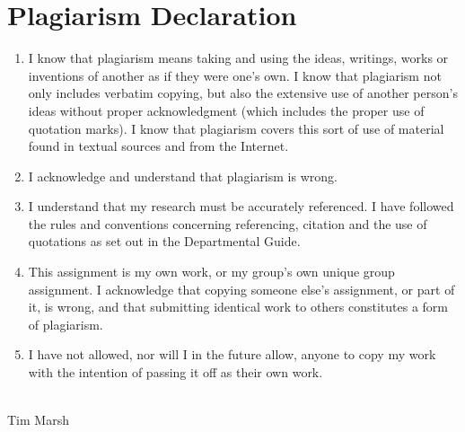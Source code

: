 \chapter*{Plagiarism Declaration}

	\begin{enumerate}
	
	\item
	I know that plagiarism means taking and using the ideas, writings, works
	or inventions of another as if they were one's own. I know that plagiarism
	not only includes verbatim copying, but also the extensive use of another
	person's ideas without proper acknowledgment (which includes the proper
	use of quotation marks). I know that plagiarism covers this sort of use of
	material found in textual sources and from the Internet.
	
	\item
	I acknowledge and understand that plagiarism is wrong.
	
	\item
	I understand that my research must be accurately referenced. I have
	followed the rules and conventions concerning referencing, citation and
	the use of quotations as set out in the Departmental Guide.
	
	\item
	This assignment is my own work, or my group's own unique group assignment.
	I acknowledge that copying someone else's assignment, or part of
	it, is wrong, and that submitting identical work to others constitutes a
	form of plagiarism.
	
	\item
	I have not allowed, nor will I in the future allow, anyone to copy my work
	with the intention of passing it off as their own work.\\
	\\
	
	\end{enumerate}
		
	Tim Marsh
	
	\newpage